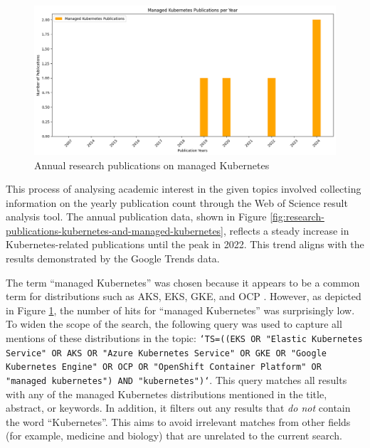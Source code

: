 \begin{figure}
    \centering
    \includegraphics[width=1\linewidth]{resources/publications-plot-managed-k8s.png}
    \caption{Annual research publications on managed Kubernetes}
    \label{fig:research-publications-managed-kubernetes}
\end{figure}

This process of analysing academic interest in the given topics involved collecting information on the yearly publication count through the Web of Science result analysis tool. The annual publication data, shown in Figure \ref{fig:research-publications-kubernetes-and-managed-kubernetes}, reflects a steady increase in Kubernetes-related publications until the peak in 2022. This trend aligns with the results demonstrated by the Google Trends data.

The term ``managed Kubernetes'' was chosen because it appears to be a common term for distributions such as AKS, EKS, GKE, and OCP \cite{AmazonEKSCustomers,ManagedKubernetesService,pereiraferreiraPerformanceEvaluationContainers2019}. However, as depicted in Figure \ref{fig:research-publications-managed-kubernetes}, the number of hits for ``managed Kubernetes'' was surprisingly low. To widen the scope of the search, the following query was used to capture all mentions of these distributions in the topic: \texttt{`TS=((EKS OR "Elastic Kubernetes Service" OR AKS OR "Azure Kubernetes Service" OR GKE OR "Google Kubernetes Engine" OR OCP OR "OpenShift Container Platform" OR "managed kubernetes") AND "kubernetes")`}. This query matches all results with any of the managed Kubernetes distributions mentioned in the title, abstract, or keywords. In addition, it filters out any results that \textit{do not} contain the word ``Kubernetes''. This aims to avoid irrelevant matches from other fields (for example, medicine and biology) that are unrelated to the current search.

